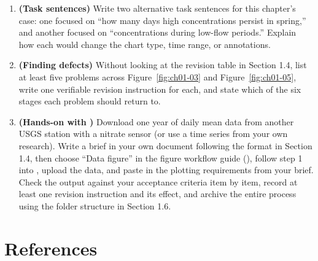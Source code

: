 \begin{enumerate}
\item \textbf{(Task sentences)} Write two alternative task sentences for this chapter's case: one focused on ``how many days high concentrations persist in spring,'' and another focused on ``concentrations during low-flow periods.'' Explain how each would change the chart type, time range, or annotations.
\item \textbf{(Finding defects)} Without looking at the revision table in Section 1.4, list at least five problems across Figure~\ref{fig:ch01-03} and Figure~\ref{fig:ch01-05}, write one verifiable revision instruction for each, and state which of the six stages each problem should return to.
\item \textbf{(Hands-on with \scidraw{})} Download one year of daily mean data from another USGS station with a nitrate sensor (or use a time series from your own research). Write a brief in your own document following the format in Section 1.4, then choose ``Data figure'' in the figure workflow guide (), follow step 1 into , upload the data, and paste in the plotting requirements from your brief. Check the output against your acceptance criteria item by item, record at least one revision instruction and its effect, and archive the entire process using the folder structure in Section 1.6.
\end{enumerate}

\section*{References}


